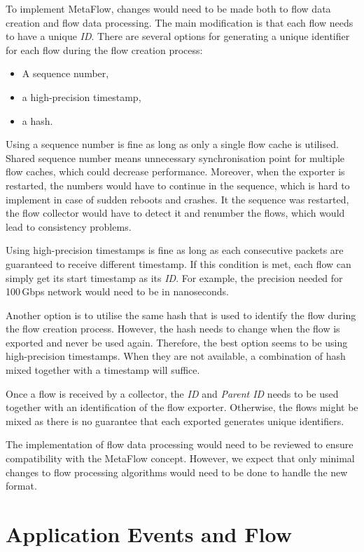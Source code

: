 To implement MetaFlow, changes would need to be made both to flow data creation and flow data processing. The main modification is that each flow needs to have a unique \emph{ID}. There are several options for generating a unique identifier for each flow during the flow creation process:
\begin{itemize}
    \item A sequence number,
    \item a high-precision timestamp,
    \item a hash.
\end{itemize}

Using a sequence number is fine as long as only a single flow cache is utilised. Shared sequence number means unnecessary synchronisation point for multiple flow caches, which could decrease performance. Moreover, when the exporter is restarted, the numbers would have to continue in the sequence, which is hard to implement in case of sudden reboots and crashes. It the sequence was restarted, the flow collector would have to detect it and renumber the flows, which would lead to consistency problems.

Using high-precision timestamps is fine as long as each consecutive packets are guaranteed to receive different timestamp. If this condition is met, each flow can simply get its start timestamp as its \emph{ID}. For example, the precision needed for 100\,Gbps network would need to be in nanoseconds.

Another option is to utilise the same hash that is used to identify the flow during the flow creation process. However, the hash needs to change when the flow is exported and never be used again. Therefore, the best option seems to be using high-precision timestamps. When they are not available, a combination of hash mixed together with a timestamp will suffice.

Once a flow is received by a collector, the \emph{ID} and \emph{Parent ID} needs to be used together with an identification of the flow exporter. Otherwise, the flows might be mixed as there is no guarantee that each exported generates unique identifiers.

The implementation of flow data processing would need to be reviewed to ensure compatibility with the MetaFlow concept. However, we expect that only minimal changes to flow processing algorithms would need to be done to handle the new format.

\section{Application Events and Flow}\label{sec:app-events}

